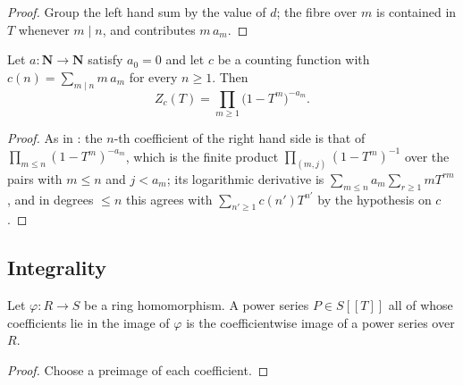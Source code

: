 \begin{proof}
  \leanok
  Group the left hand sum by the value of $d$; the fibre over $m$ is contained
  in $T$ whenever $m\mid n$, and contributes $m\,a_m$.
\end{proof}

\begin{theorem}
  \label{thm:weil-counting-zeta-degree-euler-product}
  \leanok

  Let $a\colon\mathbf N\to\mathbf N$ satisfy $a_0=0$ and let $c$ be a counting
  function with $c(n)=\sum_{m\mid n}m\,a_m$ for every $n\ge 1$.  Then
  \[
    Z_c(T)=\prod_{m\ge 1}\bigl(1-T^m\bigr)^{-a_m}.
  \]
\end{theorem}

\begin{proof}
  \leanok
  As in : the $n$-th coefficient of
  the right hand side is that of $\prod_{m\le n}(1-T^m)^{-a_m}$, which is the
  finite product $\prod_{(m,j)}(1-T^m)^{-1}$ over the pairs with $m\le n$ and
  $j<a_m$; its logarithmic derivative is
  $\sum_{m\le n}a_m\sum_{r\ge 1}mT^{rm}$, and in degrees $\le n$ this agrees
  with $\sum_{n'\ge1}c(n')T^{n'}$ by the hypothesis on $c$.
\end{proof}

\subsection{Integrality}

\begin{lemma}
  \label{lemma:weil-exists-map-eq-of-coeff-mem-range}
  \leanok

  Let $\varphi\colon R\to S$ be a ring homomorphism.  A power series
  $P\in S[[T]]$ all of whose coefficients lie in the image of $\varphi$ is the
  coefficientwise image of a power series over $R$.
\end{lemma}

\begin{proof}
  \leanok
  Choose a preimage of each coefficient.
\end{proof}


